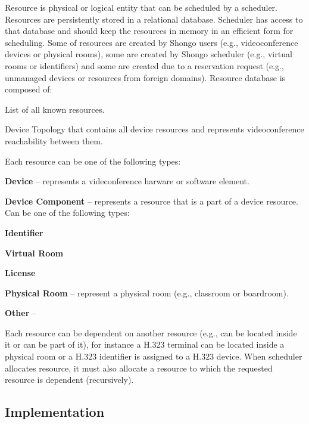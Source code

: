 Resource is physical or logical entity that can be scheduled by a scheduler. 
Resources are persistently stored in a relational database. Scheduler has 
access to that database and should keep the resources in memory in an 
efficient form for scheduling. Some of resources are created by Shongo users 
(e.g., videoconference devices or physical rooms), some are created by Shongo 
scheduler (e.g., virtual rooms or identifiers) and some are created due to a 
reservation request (e.g., unmanaged devices or resources from foreign 
domains). Resource database is composed of:
\begin{compactenum}
\item List of all known resources.
\item Device Topology that contains all device resources and represents 
videoconference reachability between them.
\end{compactenum}
Each resource can be one of the following types:
\begin{compactenum}
\item \textbf{Device} -- represents a videconference harware or software 
  element.
\item \textbf{Device Component} -- represents a resource that is a part of a 
  device resource. Can be one of the following types:
  \begin{compactenum}
    \item \textbf{Identifier}
    \item \textbf{Virtual Room}
    \item \textbf{License} 
  \end{compactenum}
\item \textbf{Physical Room} -- represent a physical room (e.g., classroom or 
  boardroom).
\item \textbf{Other} -- 
\end{compactenum}
Each resource can be dependent on another resource (e.g., can be located 
inside it or can be part of it), for instance a H.323 terminal can be located 
inside a physical room or a H.323 identifier is assigned to a H.323 device. 
When scheduler allocates resource, it must also allocate a resource to which 
the requested resource is dependent (recursively).

\subsection{Implementation}

